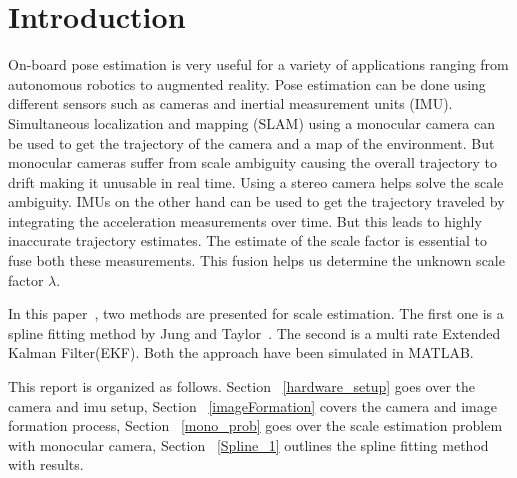 \section{Introduction}
\label{introduction}

On-board pose estimation is very useful for a variety of applications ranging from autonomous robotics to augmented reality. Pose estimation can be done using different sensors such as cameras and inertial measurement units (IMU). Simultaneous localization and mapping (SLAM) using a monocular camera can be used to get the trajectory of the camera and a map of the environment. But monocular cameras suffer from scale ambiguity causing the overall trajectory to drift making it unusable in real time. Using a stereo camera helps solve the scale ambiguity. IMUs on the other hand can be used to get the trajectory traveled by integrating the acceleration measurements over time. But this leads to highly inaccurate trajectory estimates. The estimate of the scale factor is essential to fuse both these measurements. This fusion helps us determine the unknown scale factor $\lambda$.    

In this paper~\cite{nutzi2011fusion}, two methods are presented for scale estimation. The first one is a spline fitting method by Jung and Taylor~\cite{jung2001camera}. The second is a multi rate Extended Kalman Filter(EKF). Both the approach have been simulated in MATLAB. 

This report is organized as follows. Section ~\ref{hardware_setup} goes over the camera and imu setup, Section ~\ref{imageFormation} covers the camera and image formation process, Section ~\ref{mono_prob} goes over the scale estimation problem with monocular camera, Section ~\ref{Spline_1} outlines the spline fitting method with results.